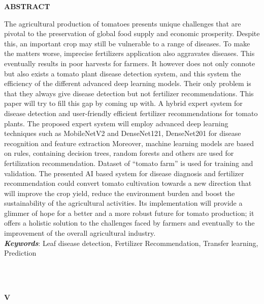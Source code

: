\documentclass[12pt, English]{article}
\begin{document}
\begin{titlepage}

\begin{center}
    \textbf{\Large ABSTRACT}\\
\end{center}

\begin{normalsize}
The agricultural production of tomatoes presents unique challenges that are pivotal to the preservation of global food supply and economic prosperity. Despite this, an important crop may still be vulnerable to a range of diseases. To make the matters worse, imprecise fertilizers application also aggravates diseases. This eventually results in poor harvests for farmers. It however does not only connote but also exists a tomato plant disease detection system, and this system the efficiency of the different advanced deep learning models. Their only problem is that they always give disease detection but not fertilizer recommendations. This paper will try to fill this gap by coming up with. A hybrid expert system for disease detection and user-friendly efficient fertilizer recommendations for tomato plants. The proposed expert system will employ advanced deep learning techniques such as MobileNetV2 and DenseNet121, DenseNet201 for disease recognition and feature extraction Moreover, machine learning models are based on rules, containing decision trees, random forests and others are used for fertilization recommendation. Dataset of “tomato farm” is used for training and validation. The presented AI based system for disease diagnosis and fertilizer recommendation could convert tomato cultivation towards a new direction that will improve the crop yield, reduce the environment burden and boost the sustainability of the agricultural activities. Its implementation will provide a glimmer of hope for a better and a more robust future for tomato production; it offers a holistic solution to the challenges faced by farmers and eventually to the improvement of the overall agricultural industry.\\
\newline
\textit{\large \bfseries Keywords}: Leaf disease detection, Fertilizer Recommendation, Transfer learning, Prediction
\end{normalsize}\\\\

\begin{normalsize}
    \begin{center}
    \vspace*{\fill}
    \textbf{V}
    \end{center}
    \end{normalsize}
\end{titlepage}
\end{document}

